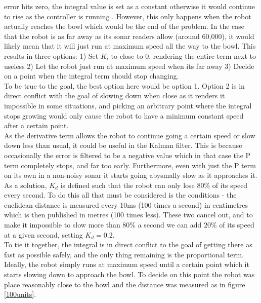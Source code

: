 \documentclass{article}
\newcommand\tab[1][1cm]{\hspace*{#1}}
\begin{document}
error hits zero, the integral value is set as a constant otherwise it would
continue to rise as the controller is running \cite{kalman}. However, this only
happens when the robot actually reaches the bowl which would be the end of the
problem. In the case that the robot is as far away as its sonar readers allow
(around 60,000), it would likely mean that it will just run at maximum speed all
the way to the bowl. This results in three options: 1) Set $K_i$ to close to 0,
rendering the entire term next to useless 2) Let the robot just run at maximum speed
when its far away 3) Decide on a point when the integral term should stop
changing. \\ 
\tab To be true to the goal, the best option here would be option 1. Option 2 is
in direct conflict with the goal of slowing down when close as it renders it
impossible in some situations, and picking an arbitrary point where the integral
stops growing would only cause the robot to have a minimum constant speed after
a certain point.
\\
\tab As the derivative term allows the robot to continue going a certain speed
or slow down less than usual, it could be useful in the Kalman filter. This is
because occasionally the error is filtered to be a negative value which in that
case the P term completely stops, and far too early. Furthermore, even with just
the P term on its own in a non-noisy sonar it starts going abysmally slow as it
approaches it. As a solution, $K_d$ is defined such that the robot can only lose
$80\%$ of its speed every second. To do this all that must be considered is the
conditions - the euclidean distance is measured every 10ms (100 times a second)
in centimetres which is then published in metres (100 times less). These two
cancel out, and to make it impossible to slow more than $80\%$ a second we can
add $20\%$ of its speed at a given second, setting $K_d=0.2$.
\\
\tab To tie it together, the integral is in direct conflict to
the goal of getting there as fast as possible safely, and the only thing
remaining is the proportional term. Ideally, the robot simply runs at maximum
speed until a certain point which it starts slowing down to approach the bowl.
To decide on this point the robot was place reasonably close to the bowl and the
distance was measured as in figure \ref{100units}.
\end{document}

